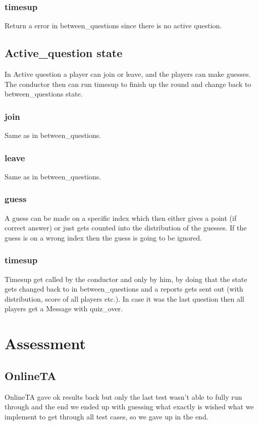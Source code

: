 \documentclass[12pt,a4paper]{article}
\begin{document}
\subsubsection{timesup}
Return a error in between\_questions since there is no active question.

\subsection{Active\_question state}
In Active question a player can join or leave, and the players can make guesses. The conductor then can run timesup to finish up the round and change back to between\_questions state.

\subsubsection{join}
Same as in between\_questions.

\subsubsection{leave}
Same as in between\_questions.

\subsubsection{guess}
A guess can be made on a specific index which then either gives a point (if correct answer) or just gets counted into the distribution of the guesses.
If the guess is on a wrong index then the guess is going to be ignored.

\subsubsection{timesup}
Timesup get called by the conductor and only by him, by doing that the state gets changed back to in between\_questions and a reports gets sent out (with distribution, score of all players etc.).
In case it was the last question then all players get a Message with quiz\_over.

\section{Assessment}

\subsection{OnlineTA}
OnlineTA gave ok results back but only the last test wasn't able to fully run through and the end we ended up with guessing what exactly is wished what we implement to get through all test cases, so we gave up in the end.
\end{document}
